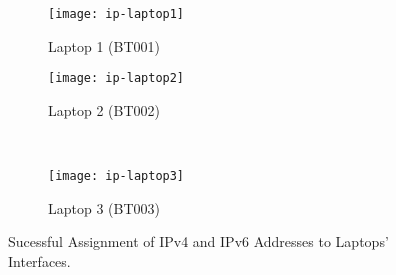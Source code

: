 \begin{figure*}[ht!]
    \centering
    \begin{subfigure}[b]{0.67\textwidth}
        \centering
        \texttt{[image: ip-laptop1]}
        \caption{Laptop 1 (BT001)}
    \end{subfigure}
    \hfill
    \begin{minipage}[b]{0.3\textwidth}
	    \begin{subfigure}[b]{\linewidth}
	        \centering
	        \texttt{[image: ip-laptop2]}
	        \caption{Laptop 2 (BT002)}
	    \end{subfigure}
	    \\
	    \begin{subfigure}[b]{\linewidth}
	        \centering
	        \texttt{[image: ip-laptop3]}
	        \caption{Laptop 3 (BT003)}
	    \end{subfigure}
	\end{minipage}
    \caption{Sucessful Assignment of IPv4 and IPv6 Addresses to Laptops' Interfaces.}
    \label{fig:ip-laptop}
\end{figure*}


